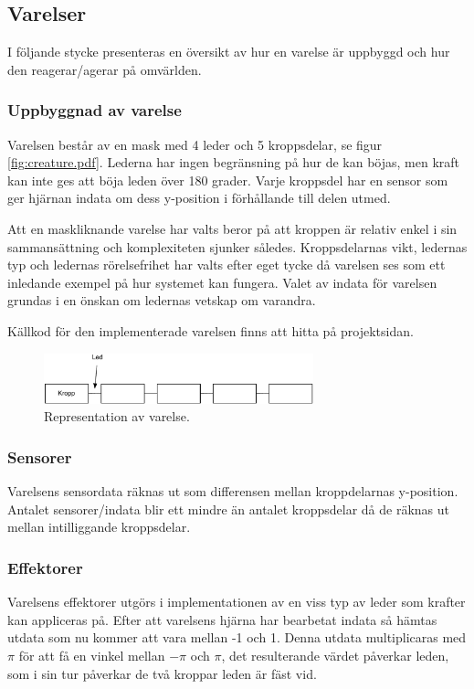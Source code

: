 \documentclass[titlepage, twocolumn, a4paper, 11pt, swedish]{article}
\begin{document}

\subsection{Varelser}
I följande stycke presenteras en översikt av hur en varelse är uppbyggd och hur den reagerar/agerar på omvärlden.

\subsubsection{Uppbyggnad av varelse}\label{sec:uppbyggnadVarelse}
Varelsen består av en mask med 4 leder och 5 kroppsdelar, se figur \vref{fig:creature.pdf}. Lederna har ingen begränsning på hur de kan böjas, men kraft kan inte ges att böja leden över 180 grader. Varje kroppsdel har en sensor som ger hjärnan indata om dess y-position i förhållande till delen utmed.

 Att en maskliknande varelse har valts beror på att kroppen är relativ enkel i sin sammansättning och komplexiteten sjunker således. Kroppsdelarnas vikt, ledernas typ och ledernas rörelsefrihet har valts efter eget tycke då varelsen ses som ett inledande exempel på hur systemet kan fungera. Valet av indata för varelsen grundas i en önskan om ledernas vetskap om varandra.

 Källkod för den implementerade varelsen finns att hitta på projektsidan.

\begin{figure}
  \begin{center}
    \includegraphics[width=78mm]{images/creature.pdf}
    \caption{Representation av varelse.}
    \label{fig:creature.pdf}
  \end{center}
\end{figure}

\subsubsection{Sensorer}
Varelsens sensordata räknas ut som differensen mellan kroppdelarnas y-position. Antalet sensorer/indata blir ett mindre än antalet kroppsdelar då de räknas ut mellan intilliggande kroppsdelar. 

\subsubsection{Effektorer}
Varelsens effektorer utgörs i implementationen av en viss typ av leder som krafter kan appliceras på. Efter att varelsens hjärna har bearbetat indata så hämtas utdata som nu kommer att vara mellan -1 och 1. Denna utdata multiplicaras med $\pi$ för att få en vinkel mellan $-\pi$ och $\pi$, det resulterande värdet påverkar leden, som i sin tur påverkar de två kroppar leden är fäst vid.
\end{document}
